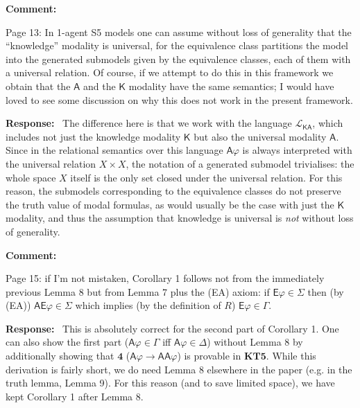 \documentclass[12pt]{article}
\newenvironment{comment}{
    \noindent\textbf{Comment:}\
    \em
}{\vspace{5mm}}
\newenvironment{response}{
    \noindent\textbf{Response:}\
}{\vspace{5mm}}
\renewcommand{\phi}{\varphi}
\newcommand{\E}{\mathsf{E}}
\newcommand{\A}{\mathsf{A}}
\newcommand{\K}{\mathsf{K}}
\begin{document}
\begin{comment}
    Page 13: In 1-agent S5 models one can assume without loss of generality
    that the ``knowledge'' modality is universal, for the equivalence class
    partitions the model into the generated submodels given by the equivalence
    classes, each of them with a universal relation. Of course, if we attempt
    to do this in this framework we obtain that the $\A$ and the
    $\K$ modality have the same semantics; I would have loved to see
    some discussion on why this does not work in the present framework.
\end{comment}

\begin{response}
    The difference here is that we work with the language $\mathcal{L}_{\K\A}$,
    which includes not just the knowledge modality $\K$ but also the universal
    modality $\A$. Since in the relational semantics over this language
    $\A\phi$ is always interpreted with the universal relation $X \times X$,
    the notation of a generated submodel trivialises: the whole space $X$
    itself is the only set closed under the universal relation. For this
    reason, the submodels corresponding to the equivalence classes do not
    preserve the truth value of modal formulas, as would usually be the case
    with just the $\K$ modality, and thus the assumption that knowledge is
    universal is \emph{not} without loss of generality.
\end{response}

\begin{comment}
   Page 15: if I’m not mistaken, Corollary 1 follows not from the immediately
   previous Lemma 8 but from Lemma 7 plus the (EA) axiom: if $\E\phi \in
   \Sigma$ then (by (EA)) $\A\E\phi \in \Sigma$ which implies (by the
   definition of $R$) $\E\phi \in \Gamma$.
\end{comment}

\begin{response}
   This is absolutely correct for the second part of Corollary 1. One can also
   show the first part ($\A\phi \in \Gamma$ iff $\A\phi \in \Delta$) without
   Lemma 8 by additionally showing that $\mathbf{4}$ ($\A\phi \rightarrow
   \A\A\phi$) is provable in $\mathbf{KT5}$. While this derivation is fairly
   short, we do need Lemma 8 elsewhere in the paper (e.g. in the truth lemma,
   Lemma 9). For this reason (and to save limited space), we have kept
   Corollary 1 after Lemma 8.
\end{response}
\end{document}
